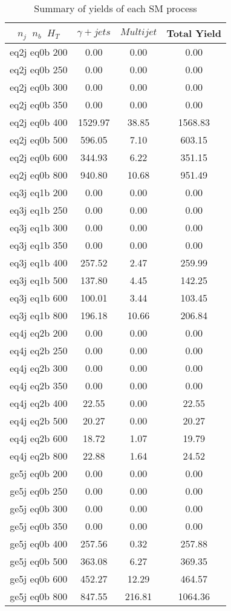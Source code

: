\begin{longtable}{| c | c | c | c  | }
\caption{Summary of yields of each SM process} \label{tab:table} \\    \hline 
$n_{j}$~$n_{b}$~$H_{T}$ & $\gamma+jets$ & $Multijet$ & Total Yield\\ \hline 
eq2j eq0b 200 & 0.00 & 0.00 & 0.00\\ \hline 
eq2j eq0b 250 & 0.00 & 0.00 & 0.00\\ \hline 
eq2j eq0b 300 & 0.00 & 0.00 & 0.00\\ \hline 
eq2j eq0b 350 & 0.00 & 0.00 & 0.00\\ \hline 
eq2j eq0b 400 & 1529.97 & 38.85 & 1568.83\\ \hline 
eq2j eq0b 500 & 596.05 & 7.10 & 603.15\\ \hline 
eq2j eq0b 600 & 344.93 & 6.22 & 351.15\\ \hline 
eq2j eq0b 800 & 940.80 & 10.68 & 951.49\\ \hline 
eq3j eq1b 200 & 0.00 & 0.00 & 0.00\\ \hline 
eq3j eq1b 250 & 0.00 & 0.00 & 0.00\\ \hline 
eq3j eq1b 300 & 0.00 & 0.00 & 0.00\\ \hline 
eq3j eq1b 350 & 0.00 & 0.00 & 0.00\\ \hline 
eq3j eq1b 400 & 257.52 & 2.47 & 259.99\\ \hline 
eq3j eq1b 500 & 137.80 & 4.45 & 142.25\\ \hline 
eq3j eq1b 600 & 100.01 & 3.44 & 103.45\\ \hline 
eq3j eq1b 800 & 196.18 & 10.66 & 206.84\\ \hline 
eq4j eq2b 200 & 0.00 & 0.00 & 0.00\\ \hline 
eq4j eq2b 250 & 0.00 & 0.00 & 0.00\\ \hline 
eq4j eq2b 300 & 0.00 & 0.00 & 0.00\\ \hline 
eq4j eq2b 350 & 0.00 & 0.00 & 0.00\\ \hline 
eq4j eq2b 400 & 22.55 & 0.00 & 22.55\\ \hline 
eq4j eq2b 500 & 20.27 & 0.00 & 20.27\\ \hline 
eq4j eq2b 600 & 18.72 & 1.07 & 19.79\\ \hline 
eq4j eq2b 800 & 22.88 & 1.64 & 24.52\\ \hline 
ge5j eq0b 200 & 0.00 & 0.00 & 0.00\\ \hline 
ge5j eq0b 250 & 0.00 & 0.00 & 0.00\\ \hline 
ge5j eq0b 300 & 0.00 & 0.00 & 0.00\\ \hline 
ge5j eq0b 350 & 0.00 & 0.00 & 0.00\\ \hline 
ge5j eq0b 400 & 257.56 & 0.32 & 257.88\\ \hline 
ge5j eq0b 500 & 363.08 & 6.27 & 369.35\\ \hline 
ge5j eq0b 600 & 452.27 & 12.29 & 464.57\\ \hline 
ge5j eq0b 800 & 847.55 & 216.81 & 1064.36\\ \hline 
    \hline 
    \hline 
\end{longtable}
